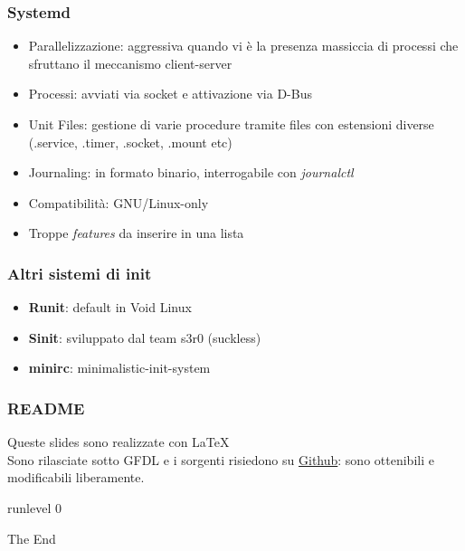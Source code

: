 \documentclass{beamer}
\begin{document}

\begin{frame}
	\frametitle{Systemd}
	\begin{itemize}
		\item Parallelizzazione: aggressiva quando vi \`e la presenza massiccia di processi che sfruttano il meccanismo client-server
		\item Processi: avviati via socket e attivazione via D-Bus
		\item Unit Files: gestione di varie procedure tramite files con estensioni diverse (.service, .timer, .socket, .mount etc)
		\item Journaling: in formato binario, interrogabile con \textit{journalctl}
		\item Compatibilit\`a: GNU/Linux-only
		\item Troppe \textit{features} da inserire in una lista
	\end{itemize}
\end{frame}


\begin{frame}
	\frametitle{Altri sistemi di init}
	\begin{itemize}
		\item \textbf{Runit}: default in Void Linux
		\item \textbf{Sinit}: sviluppato dal team s3r0 (suckless)
		\item \textbf{minirc}: minimalistic-init-system
	\end{itemize}
\end{frame}


\begin{frame}
	\frametitle{README}
\begin{center}
		Queste slides sono realizzate con \LaTeX  \\

	Sono rilasciate sotto GFDL
	e i sorgenti risiedono su \href{https://github.com/smlb/LinuxDay2014-smlb}{Github}: sono ottenibili e modificabili liberamente.
	\end{center}
\end{frame}
\begin{frame}
\Huge{\centerline{runlevel 0}}
\huge{\centerline{The End}}
\end{frame}

\end{document}
